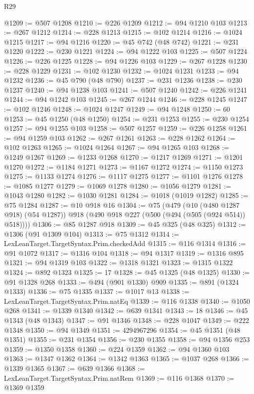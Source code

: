 \begin{lexlean}{R29}
\begin{coremodule}
@1209 := @507 @1208
@1210 := @226 @1209
@1212 := @94 @1210 @103
@1213 := @267 @1212
@1214 := @228 @1213
@1215 := @102 @1214
@1216 := @1024 @1215
@1217 := @94 @1216
@1220 := @45 @742 (@48 @742)
@1221 := @231 @1220
@1222 := @230 @1221
@1224 := @94 @1222 @103
@1225 := @507 @1224
@1226 := @226 @1225
@1228 := @94 @1226 @103
@1229 := @267 @1228
@1230 := @228 @1229
@1231 := @102 @1230
@1232 := @1024 @1231
@1233 := @94 @1232
@1236 := @45 @790 (@48 @790)
@1237 := @231 @1236
@1238 := @230 @1237
@1240 := @94 @1238 @103
@1241 := @507 @1240
@1242 := @226 @1241
@1244 := @94 @1242 @103
@1245 := @267 @1244
@1246 := @228 @1245
@1247 := @102 @1246
@1248 := @1024 @1247
@1249 := @94 @1248
@1250 := 60
@1253 := @45 @1250 (@48 @1250)
@1254 := @231 @1253
@1255 := @230 @1254
@1257 := @94 @1255 @103
@1258 := @507 @1257
@1259 := @226 @1258
@1261 := @94 @1259 @103
@1262 := @267 @1261
@1263 := @228 @1262
@1264 := @102 @1263
@1265 := @1024 @1264
@1267 := @94 @1265 @103
@1268 := @1249 @1267
@1269 := @1233 @1268
@1270 := @1217 @1269
@1271 := @1201 @1270
@1272 := @1184 @1271
@1273 := @1167 @1272
@1274 := @1150 @1273
@1275 := @1133 @1274
@1276 := @1117 @1275
@1277 := @1101 @1276
@1278 := @1085 @1277
@1279 := @1069 @1278
@1280 := @1056 @1279
@1281 := @1043 @1280
@1282 := @1030 @1281
@1284 := @1018 (@1019 @1282)
@1285 := @75 @1284
@1287 := @10 @918 @16
@1304 := @75
    (@479
      (@10 (@480 @1287 @918) (@54 @1287))
      @918
      (@490 @918 @227 (@500 (@494 (@505 (@924 @514)) @518))))
@1306 := @85 @1287 @918
@1309 := @45 @325 (@48 @325)
@1312 := @1306 (@91 @1309 @104)
@1313 := @75 @1312
@1314 := LexLeanTarget.TargetSyntax.Prim.checkedAdd
@1315 := @116 @1314
@1316 := @91 @1072
@1317 := @1316 @104
@1318 := @94 @1317
@1319 := @1316 @895
@1321 := @94 @1319 @103
@1322 := @1318 @1321
@1323 := @1315 @1322
@1324 := @892 @1323
@1325 := 17
@1328 := @45 @1325 (@48 @1325)
@1330 := @91 @1328 @268
@1333 := @494 (@901 @1330) @909
@1335 := @891 (@1324 @1333)
@1336 := @75 @1335
@1337 := @1017 @13
@1338 := LexLeanTarget.TargetSyntax.Prim.natEq
@1339 := @116 @1338
@1340 := @1050 @268
@1341 := @1339 @1340
@1342 := @639 @1341
@1343 := 18
@1346 := @45 @1343 (@48 @1343)
@1347 := @91 @1346
@1348 := @228 @1047
@1349 := @222 @1348
@1350 := @94 @1349
@1351 := 4294967296
@1354 := @45 @1351 (@48 @1351)
@1355 := @231 @1354
@1356 := @230 @1355
@1358 := @94 @1356 @253
@1359 := @1350 @1358
@1360 := @224 @1359
@1362 := @94 @1360 @103
@1363 := @1347 @1362
@1364 := @1342 @1363
@1365 := @1037 @268
@1366 := @1339 @1365
@1367 := @639 @1366
@1368 := LexLeanTarget.TargetSyntax.Prim.natRem
@1369 := @116 @1368
@1370 := @1369 @1359

\end{coremodule}
\end{lexlean}
